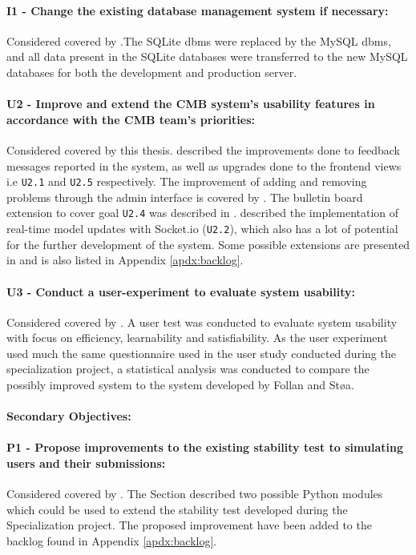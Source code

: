 \paragraph*{I1 - Change the existing database management system if necessary:} Considered covered by .The SQLite \gls{dbms} were replaced by the MySQL \gls{dbms}, and all data present in the SQLite databases were transferred to the new MySQL databases for both the development and production server.

\paragraph*{U2 - Improve and extend the CMB system’s usability features in accordance with the CMB team’s priorities:} Considered covered by this thesis.  described the improvements done to feedback messages reported in the system, as well as upgrades done to the frontend views i.e \texttt{U2.1} and \texttt{U2.5} respectively. The improvement of adding and removing problems through the admin interface is covered by . The bulletin board extension to cover goal \texttt{U2.4} was described in .  described the implementation of real-time model updates with Socket.io (\texttt{U2.2}), which also has a lot of potential for the further development of the system. Some possible extensions are presented in  and is also listed in Appendix \ref{apdx:backlog}.

\paragraph*{U3 - Conduct a user-experiment to evaluate system usability:} Considered covered by . A user test was conducted to evaluate system usability with focus on efficiency, learnability and satisfiability. As the user experiment used much the same questionnaire used in the user study conducted during the specialization project, a statistical analysis was conducted to compare the possibly improved system to the system developed by Follan and Støa.

\paragraph*{Secondary Objectives:} \hfill

\paragraph*{P1 - Propose improvements to the existing stability test to simulating users and their submissions:} Considered covered by . The Section described two possible Python modules which could be used to extend the stability test developed during the Specialization project. The proposed improvement have been added to the backlog found in Appendix \ref{apdx:backlog}.

